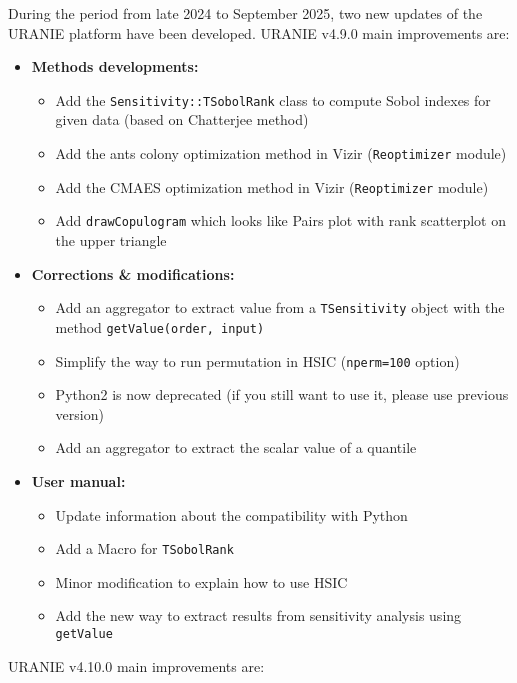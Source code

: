 During the period from late 2024 to September 2025, two new updates of the URANIE platform have been developed.
URANIE v4.9.0 main improvements are:
\begin{itemize}
	\item \textbf{Methods developments:}
	\begin{itemize}
		\item Add the \texttt{Sensitivity::TSobolRank} class to compute Sobol indexes for given data (based on Chatterjee method)
    	\item Add the ants colony optimization method in Vizir (\texttt{Reoptimizer} module)
    	\item Add the CMAES optimization method in Vizir (\texttt{Reoptimizer} module)
    	\item Add \texttt{drawCopulogram} which looks like Pairs plot with rank scatterplot on the upper triangle
	\end{itemize}
	\item \textbf{Corrections \& modifications:}
	\begin{itemize}
		\item Add an aggregator to extract value from a \texttt{TSensitivity} object with the method \texttt{getValue(order, input)}
    	\item Simplify the way to run permutation in HSIC (\texttt{nperm=100} option)
    	\item Python2 is now deprecated (if you still want to use it, please use previous version)
    	\item Add an aggregator to extract the scalar value of a quantile
	\end{itemize}
	\item \textbf{User manual:}
	\begin{itemize}
		\item Update information about the compatibility with Python
   		\item Add a Macro for \texttt{TSobolRank}
    	\item Minor modification to explain how to use HSIC
    	\item Add the new way to extract results from sensitivity analysis using \texttt{getValue} 
	\end{itemize}
\end{itemize}
URANIE v4.10.0 main improvements are:

